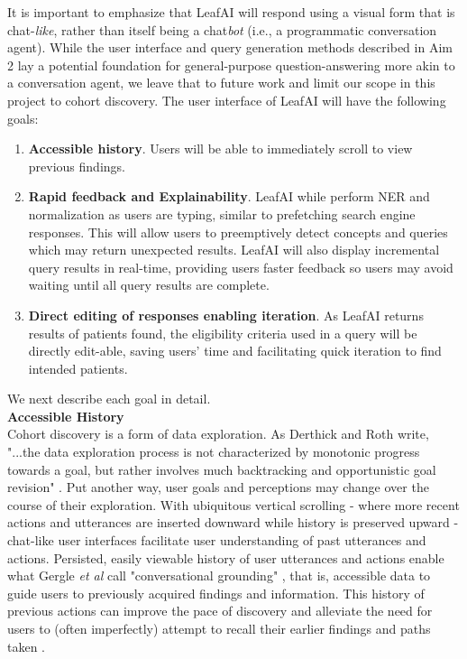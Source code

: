 \documentclass[../main.tex]{subfiles}
\begin{document}
It is important to emphasize that LeafAI will respond using a visual form that is chat-\textit{like}, rather than itself being a chat\textit{bot} (i.e., a programmatic conversation agent). While the user interface and query generation methods described in Aim 2 lay a potential foundation for general-purpose question-answering more akin to a conversation agent, we leave that to future work and limit our scope in this project to cohort discovery. The user interface of LeafAI will have the following goals:

\begin{enumerate}
    \item \textbf{Accessible history}. Users will be able to immediately scroll to view previous findings.
    \item \textbf{Rapid feedback and Explainability}. LeafAI while perform NER and normalization as users are typing, similar to prefetching search engine responses. This will allow users to preemptively detect concepts and queries which may return unexpected results. LeafAI will also display incremental query results in real-time, providing users faster feedback so users may avoid waiting until all query results are complete.
    \item \textbf{Direct editing of responses enabling iteration}. As LeafAI returns results of patients found, the eligibility criteria used in a query will be directly edit-able, saving users' time and facilitating quick iteration to find intended patients.
\end{enumerate}

\noindent We next describe each goal in detail. \\

\noindent \textbf{Accessible History} \\
Cohort discovery is a form of data exploration. As Derthick and Roth write, "...the data exploration process is not characterized by monotonic progress towards a goal, but rather involves much backtracking and opportunistic goal revision" \cite{derthick2001enhancing}. Put another way, user goals and perceptions may change over the course of their exploration. With ubiquitous vertical scrolling - where more recent actions and utterances are inserted downward while history is preserved upward - chat-like user interfaces facilitate user understanding of past utterances and actions. Persisted, easily viewable history of user utterances and actions enable what Gergle \textit{et al} call "conversational grounding" \cite{gergle2004persistence}, that is, accessible data to guide users to previously acquired findings and information. This history of previous actions can improve the pace of discovery and alleviate the need for users to (often imperfectly) attempt to recall their earlier findings and paths taken \cite{hill1994history, gergle2004persistence}. \\
\end{document}
